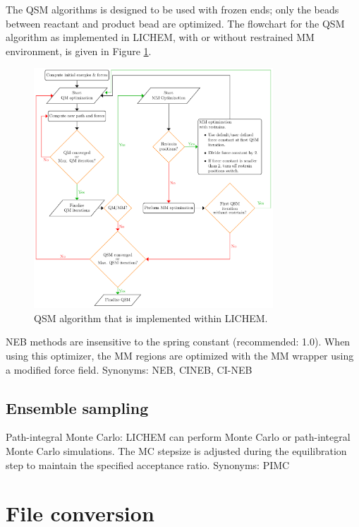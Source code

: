 \documentclass[12pt]{report}
\begin{document}
The QSM algorithms is designed to be used with frozen ends;
only the beads between reactant and product bead are optimized. The flowchart
for the QSM algorithm as implemented in LICHEM, with or without
restrained MM environment, is given in Figure \ref{fig:qsm}.

\begin{center}
\begin{figure}[ht!]
\centering
\includegraphics[width=0.8\textwidth]{manual/qsm_flowchart.pdf}
\caption{QSM algorithm that is implemented within LICHEM.}
\label{fig:qsm}
\end{figure}
\end{center}
NEB methods are insensitive to the spring constant (recommended: 1.0).
When using this optimizer, the MM regions are optimized with the MM wrapper
using a modified force field.
Synonyms: NEB, CINEB, CI-NEB \\

\subsection{Ensemble sampling}

Path-integral Monte Carlo: LICHEM can perform Monte Carlo or path-integral
Monte Carlo simulations.
The MC stepsize is adjusted during the equilibration step to maintain the
specified acceptance ratio.
Synonyms: PIMC \\

\section{File conversion}
\end{document}
